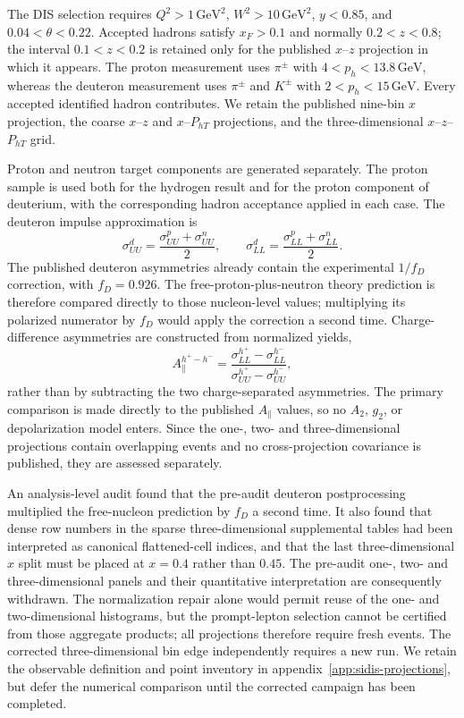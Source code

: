 \documentclass[11pt,a4paper]{article}
\newcommand{\suu}{\sigma_{UU}}
\newcommand{\sll}{\sigma_{LL}}
\newcommand{\GeV}{\ensuremath{\,\mathrm{GeV}}}
\begin{document}
The DIS selection requires $Q^2>1\,\mathrm{GeV}^2$,
$W^2>10\,\mathrm{GeV}^2$, $y<0.85$, and
$0.04<\theta<0.22$.  Accepted hadrons satisfy $x_F>0.1$ and normally
$0.2<z<0.8$; the interval $0.1<z<0.2$ is retained only for the published
$x$--$z$ projection in which it appears.  The proton measurement uses
$\pi^\pm$ with $4<p_h<13.8\GeV$, whereas the deuteron measurement uses
$\pi^\pm$ and $K^\pm$ with $2<p_h<15\GeV$.  Every accepted identified hadron
contributes.  We retain the published nine-bin $x$ projection, the coarse
$x$--$z$ and $x$--$P_{hT}$ projections, and the three-dimensional
$x$--$z$--$P_{hT}$ grid.

Proton and neutron target components are generated separately.  The proton
sample is used both for the hydrogen result and for the proton component of
deuterium, with the corresponding hadron acceptance applied in each case.
The deuteron impulse approximation is
\begin{equation}
 \suu^d=\frac{\suu^p+\suu^n}{2},\qquad
 \sll^d=\frac{\sll^p+\sll^n}{2}.
 \label{eq:sidis-deuteron}
\end{equation}
The published deuteron asymmetries already contain the experimental
$1/f_D$ correction, with $f_D=0.926$.  The free-proton-plus-neutron theory
prediction is therefore compared directly to those nucleon-level values;
multiplying its polarized numerator by $f_D$ would apply the correction a
second time.
Charge-difference asymmetries are constructed from normalized yields,
\begin{equation}
 A_\parallel^{h^+-h^-}=
 \frac{\sll^{h^+}-\sll^{h^-}}
      {\suu^{h^+}-\suu^{h^-}},
 \label{eq:sidis-charge-difference}
\end{equation}
rather than by subtracting the two charge-separated asymmetries.  The primary
comparison is made directly to the published $A_\parallel$ values, so no
$A_2$, $g_2$, or depolarization model enters.  Since the one-, two- and
three-dimensional projections contain overlapping events and no
cross-projection covariance is published, they are assessed separately.

An analysis-level audit found that the pre-audit deuteron postprocessing
multiplied the free-nucleon prediction by $f_D$ a second time.  It also found
that dense row numbers in the sparse three-dimensional supplemental tables
had been interpreted as canonical flattened-cell indices, and that the last
three-dimensional $x$ split must be placed at $x=0.4$ rather than $0.45$.
The pre-audit one-, two- and three-dimensional panels and their quantitative
interpretation are consequently withdrawn.  The normalization repair alone
would permit reuse of the one- and two-dimensional histograms, but the
prompt-lepton selection cannot be certified from those aggregate products;
all projections therefore require fresh events.  The corrected
three-dimensional bin edge independently requires a new run.  We retain the
observable definition and point inventory in
appendix~\ref{app:sidis-projections}, but defer the numerical comparison
until the corrected campaign has been completed.
\end{document}

